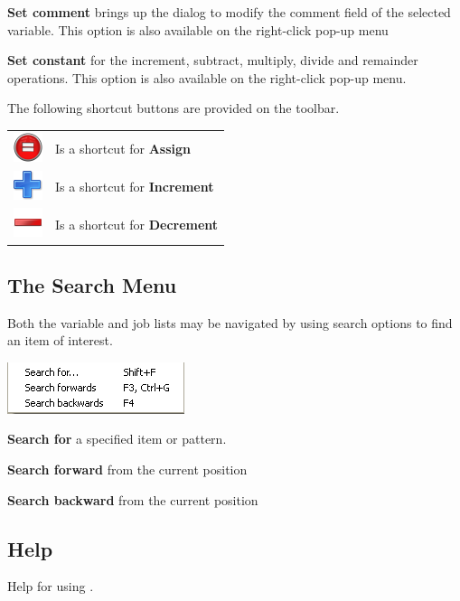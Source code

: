 \textbf{Set comment} brings up the dialog to modify the comment field of
the selected variable. This option is also available on the right-click
pop-up menu

\textbf{Set constant} for the increment, subtract, multiply, divide and
remainder operations. This option is also available on the right-click
pop-up menu.

The following shortcut buttons are provided on the toolbar.

\begin{tabular}{l p{12cm}}
\includegraphics{img/btqwvass.png} & Is a shortcut for \textbf{Assign}\\
\includegraphics{img/btqwvincr.png} & Is a shortcut for \textbf{Increment}\\
\includegraphics{img/btqwvdecr.png} & Is a shortcut for \textbf{Decrement}\\
\end{tabular}

\subsection{The Search Menu}
Both the variable and job lists may be navigated by using search options
to find an item of interest.

\includegraphics{img/btqwsearchmenu.png} 

\textbf{Search for} a specified item or pattern.

\textbf{Search forward} from the current position

\textbf{Search backward} from the current position

\subsection{Help}
Help for using .

